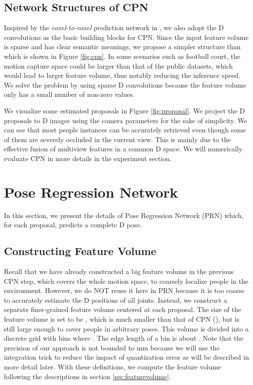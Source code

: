 \documentclass[runningheads]{llncs}
\begin{document}
\subsection{Network Structures of CPN}
Inspired by the \emph{voxel-to-voxel} prediction network in \cite{moon2018v2v}, we also adopt the D convolutions as the basic building blocks for CPN. Since the input feature volume is sparse and has clear semantic meanings, we propose a simpler structure than \cite{moon2018v2v} which is shown in Figure \ref{fig:cpn}. In some scenarios such as football court, the motion capture space could be larger than that of the public datasets, which would lead to larger feature volume, thus notably reducing the inference speed. We solve the problem by using sparse D convolutions \cite{yan2018second} because the feature volume only has a small number of non-zero values.

We visualize some estimated proposals in Figure \ref{fig:proposal}. We project the D proposals to D images using the camera parameters for the sake of simplicity. We can see that most people instances can be accurately retrieved even though some of them are severely occluded in the current view. This is mainly due to the effective fusion of multiview features in a common D space.  We will numerically evaluate CPN in more details in the experiment section.


\section{Pose Regression Network}
In this section, we present the details of Pose Regression Network (PRN) which, for each proposal, predicts a complete D pose. 

\subsection{Constructing Feature Volume}
Recall that we have already constructed a big feature volume in the previous CPN step, which covers the whole motion space, to coarsely localize people in the environment. However, we do NOT reuse it here in PRN because it is too coarse to accurately estimate the D positions of all joints. Instead, we construct a separate finer-grained feature volume centered at each proposal. The size of the feature volume is set to be , which is much smaller than that of CPN (), but is still large enough to cover people in arbitrary poses. This volume is divided into a discrete grid with  bins where . The edge length of a bin is about . Note that the precision of our approach is not bounded to mm because we will use the integration trick \cite{sun2018integral} to reduce the impact of quantization error as will be described in more detail later. With these definitions, we compute the feature volume following the descriptions in section \ref{sec:featurevolume}.
\end{document}
